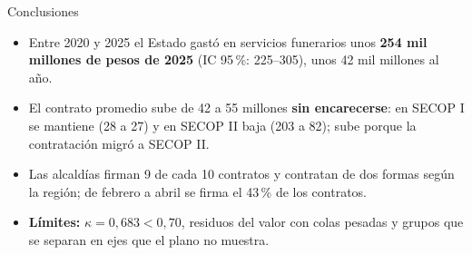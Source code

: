 \begin{frame}[t]
\begin{columns}[t]
\begin{column}{\colwidth}
\begin{minipage}[t][\altocolumnas][s]{\linewidth}
  \begin{block}{Conclusiones}
    \begin{itemize}
      \setlength{\itemsep}{0.5em}
      \item Entre 2020 y 2025 el Estado gastó en servicios funerarios unos \textbf{254 mil millones de pesos de 2025} (IC 95\,\%: 225–305), unos 42 mil millones al año.
      \item El contrato promedio sube de 42 a 55 millones \textbf{sin encarecerse}: en SECOP I se mantiene (28 a 27) y en SECOP II baja (203 a 82); sube porque la contratación migró a SECOP II.
      \item Las alcaldías firman 9 de cada 10 contratos y contratan de dos formas según la región; de febrero a abril se firma el 43\,\% de los contratos.
      \item \textbf{Límites:} $\kappa = 0{,}683 < 0{,}70$, residuos del valor con colas pesadas y grupos que se separan en ejes que el plano no muestra.
    \end{itemize}
  \end{block}
  \vfill


\end{minipage}
\end{column}
\end{columns}
\end{frame}
